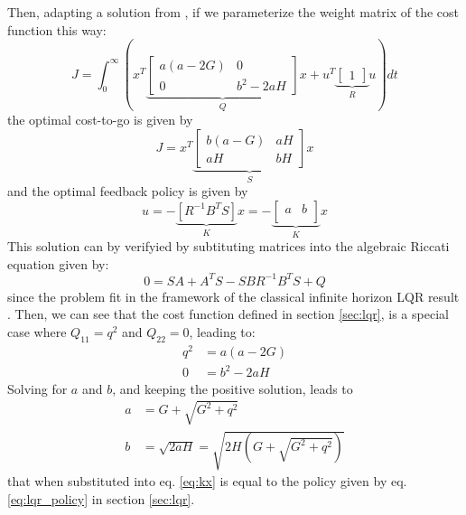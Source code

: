 Then, adapting a solution from \cite{hanks_closed-form_1991}, if we parameterize the weight matrix of the cost function this way:
\begin{equation}
J = \int_0^{\infty}{ \left( x^T 
\underbrace{
\begin{bmatrix}
    a(a-2G) & 0 \\
    0       & b^2 - 2 a H
\end{bmatrix}
}_{Q} x
+
u^T 
\underbrace{
\begin{bmatrix}
    1 
\end{bmatrix}
}_{R} u
\right) dt } 
\end{equation}
the optimal cost-to-go is given by
\begin{equation}
J =   x^T 
\underbrace{
\begin{bmatrix}
    b(a-G) & aH \\
    aH       & bH
\end{bmatrix}
}_{S} x
\end{equation}
and the optimal feedback policy is given by
\begin{equation}
u = 
- \underbrace{\left[ R^{-1} B^T S\right]}_{K} x
=
-
\underbrace{
\begin{bmatrix}
    a & b \\
\end{bmatrix}
}_{K} x
\label{eq:kx}
\end{equation}
This solution can by verifyied by subtituting matrices into the algebraic Riccati equation given by:
\begin{equation}
0 = SA + A^T S - SBR^{-1}B^TS + Q
\end{equation}
since the problem fit in the framework of the classical infinite horizon LQR result \cite{bertsekas_dynamic_2012}. 
Then, we can see that the cost function defined in section \ref{sec:lqr}, is a special case where $Q_{11} = q^2$ and $Q_{22}=0$, leading to:
\begin{align}
q^2 &= a(a-2G) \\
0   &= b^2 -2aH
\end{align}
Solving for $a$ and $b$, and keeping the positive solution, leads to
\begin{align}
a &= G + \sqrt{G^2+q^2} \\
b &= \sqrt{2aH} = \sqrt{2H(G + \sqrt{G^2+q^2})}
\end{align}
that when substituted into eq. \eqref{eq:kx} is equal to the policy given by eq. \eqref{eq:lqr_policy} in section \ref{sec:lqr}.



